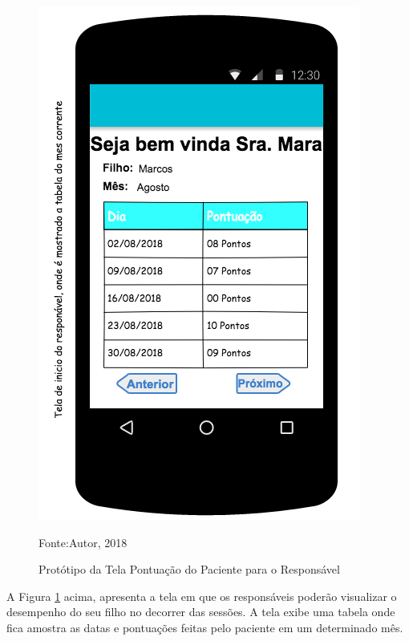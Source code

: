 \begin{itemize}
		\begin{figure}[H]
			\centering
			\includegraphics[scale=0.6]{img/pontospaciente.png}
			\caption{Protótipo da Tela Pontuação do Paciente para o Responsável}
			Fonte:Autor, 2018
			\label{pontos}
		\end{figure}
		
		A Figura  \ref{pontos} acima, apresenta a tela em que os responsáveis poderão visualizar o desempenho do seu filho no decorrer das sessões. A tela exibe uma tabela onde fica amostra as datas e pontuações feitas pelo paciente em um determinado mês.
		 

\end{itemize}
